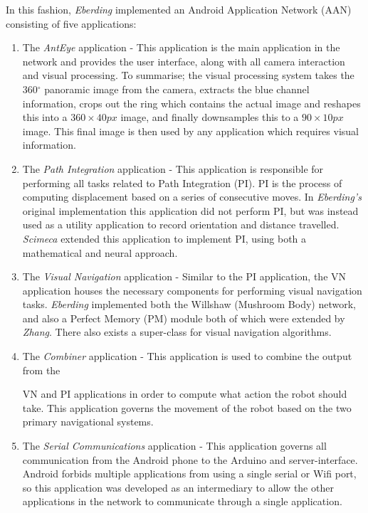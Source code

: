 \documentclass[a4paper,12pt]{article}
\begin{document}
In this fashion, \textit{Eberding} implemented an Android Application Network (AAN) consisting of
five applications:
\newline

\begin{enumerate}
\item{
    The \textit{AntEye} application - This application is the main application in the network and
    provides the user interface, along with all camera interaction and visual processing. To summarise;
    the visual processing system takes the 360$^{\circ}$ panoramic image from the camera, extracts
    the blue channel information, crops out the ring which contains the actual image and reshapes
    this into a $360\times40px$ image, and finally downsamples this to a $90\times10px$ image. This
    final image is then used by any application which requires visual information.
  }

\item{
    The \textit{Path Integration} application - This application is responsible for performing all
    tasks related to Path Integration (PI). PI is the process of computing displacement
    based on a series of consecutive moves. In \textit{Eberding's} original implementation this
    application did not perform PI, but was instead used as a utility application to record orientation
    and distance travelled. \textit{Scimeca} extended this application to implement PI, using both a
    mathematical and neural approach.
  }

\item{
    The \textit{Visual Navigation} application - Similar to the PI application, the VN application
    houses the necessary components for performing visual navigation tasks. \textit{Eberding}
    implemented both the Willshaw (Mushroom Body) network, and also a Perfect Memory (PM) module both
    of which were extended by \textit{Zhang}. There also exists a super-class for visual navigation
    algorithms.
    }

\item{
    The \textit{Combiner} application - This application is used to combine the output from the

    VN and PI applications in order to compute what action the robot should take. This application
    governs the movement of the robot based on the two primary navigational systems.
  }

\item{
    The \textit{Serial Communications} application - This application governs all communication from
    the Android phone to the Arduino and server-interface. Android forbids multiple applications from
    using a single serial or Wifi port, so this application was developed as an intermediary to allow
    the other applications in the network to communicate through a single application.
    }
\end{enumerate}
\end{document}
